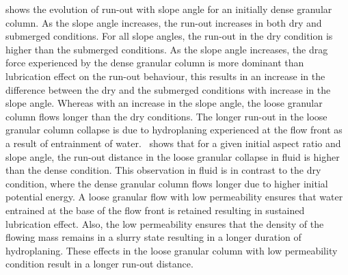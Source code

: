  shows the evolution of run-out with slope angle 
for an initially dense granular column. As the slope angle increases, the 
run-out increases in both dry and submerged conditions. For all slope angles, 
the run-out in the dry condition is higher than the submerged conditions. As 
the slope angle increases, the drag force experienced by the dense granular 
column is more dominant than lubrication effect on the run-out behaviour, this 
results in an increase in the difference between the dry and the submerged 
conditions with increase in the slope angle. Whereas with an increase in the 
slope angle, the loose granular column flows longer than the dry conditions. 
The longer run-out in the loose granular column collapse is due to hydroplaning 
experienced at the flow front as a result of entrainment of 
water.~ shows that for a 
given initial aspect ratio and slope angle, the run-out distance in the loose 
granular collapse in fluid is higher than the dense condition. This observation 
in fluid is in contrast to the dry condition, where the dense granular column 
flows longer due to higher initial potential energy. A loose granular flow with 
low permeability ensures that water entrained at the base of the flow front is 
retained resulting in sustained lubrication effect. Also, the low permeability 
ensures that the density of the flowing mass remains in a slurry state 
resulting in a longer duration of hydroplaning. These effects in the loose 
granular column with low permeability condition result in a longer run-out 
distance. 

